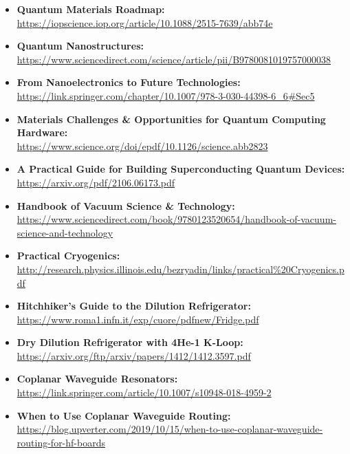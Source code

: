 \begin{itemize}
  \item\textbf{Quantum Materials Roadmap:}\\
\url{https://iopscience.iop.org/article/10.1088/2515-7639/abb74e}

  \item\textbf{Quantum Nanostructures:}\\
\url{https://www.sciencedirect.com/science/article/pii/B9780081019757000038}

  \item\textbf{From Nanoelectronics to Future Technologies:}\\
\url{https://link.springer.com/chapter/10.1007/978-3-030-44398-6_6#Sec5}

  \item\textbf{Materials Challenges \& Opportunities for Quantum Computing Hardware:}\\
\url{https://www.science.org/doi/epdf/10.1126/science.abb2823}

  \item\textbf{A Practical Guide for Building Superconducting Quantum Devices:}\\
\url{https://arxiv.org/pdf/2106.06173.pdf}

  \item\textbf{Handbook of Vacuum Science \& Technology:}\\
\url{https://www.sciencedirect.com/book/9780123520654/handbook-of-vacuum-science-and-technology}

  \item\textbf{Practical Cryogenics:}\\
\url{http://research.physics.illinois.edu/bezryadin/links/practical%20Cryogenics.pdf}

  \item\textbf{Hitchhiker’s Guide to the Dilution Refrigerator:}\\
\url{https://www.roma1.infn.it/exp/cuore/pdfnew/Fridge.pdf}

  \item\textbf{Dry Dilution Refrigerator with 4He-1 K-Loop:}\\
\url{https://arxiv.org/ftp/arxiv/papers/1412/1412.3597.pdf}

  \item\textbf{Coplanar Waveguide Resonators:}\\
\url{https://link.springer.com/article/10.1007/s10948-018-4959-2}

  \item\textbf{When to Use Coplanar Waveguide Routing:}\\
\url{https://blog.upverter.com/2019/10/15/when-to-use-coplanar-waveguide-routing-for-hf-boards}


\end{itemize}
